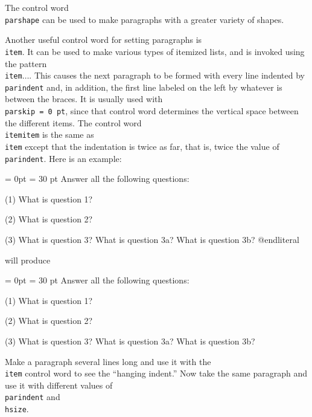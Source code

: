  \hangindent=-1.75in \hangparagraph 
 
 
The control word {\tt \\parshape} can be used to make paragraphs with 
a greater variety of shapes. 
 
Another useful control word for setting paragraphs is {\tt \\item}. 
It can be used to make various types of itemized lists, 
and is invoked using the pattern {\tt \\item\lb$\ldots$\rb}\null. 
This causes the next  paragraph to be formed with every line 
indented by {\tt \\parindent} and, in addition, the first line 
labeled on the left by whatever is between the braces.  It is 
usually used with {\tt \\parskip = 0 pt}, since that control word 
determines the vertical space between the different items. The control 
word {\tt \\itemitem} is the same as {\tt \\item} except that the 
indentation is twice as far, that is, twice the value of 
{\tt \\parindent}. 
Here is an example: 
 
\beginliteral 
\parskip = 0pt \parindent = 30 pt 
\noindent 
Answer all the following questions: 
\item{(1)} What is question 1? 
\item{(2)} What is question 2? 
\item{(3)} What is question 3? 
 What is question 3a? 
 What is question 3b? 
@endliteral 
 
 
\noindent 
will produce 
\vfill\eject 
 
{\parskip = 0pt \parindent = 30 pt 
\noindent 
Answer all the following questions: 
\item{(1)} What is question 1? 
\item{(2)} What is question 2? 
\item{(3)} What is question 3? 
 What is question 3a? 
 What is question 3b? 
 
} 
 
\exercise Make a paragraph several lines long and use it with 
the {\tt \\item} control word to see the ``hanging indent.'' Now 
take the same paragraph and use it with different values of {\tt 
\\parindent} and {\tt \\hsize}. 
\bigskip 
 
